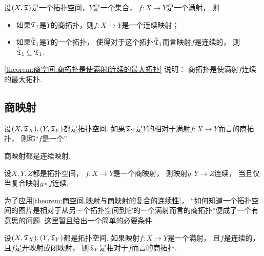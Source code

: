 \begin{theorem}\label{theorem:商空间.商拓扑是使满射f连续的最大拓扑}
设\((X,{\mathfrak T})\)是一个拓扑空间，\(Y\)是一个集合，
\(f\colon X \to Y\)是一个满射，
则\begin{itemize}
	\item 如果\({\mathfrak T}_1\)是\(Y\)的商拓扑，则\(f\colon X \to Y\)是一个连续映射；

	\item 如果\(\widetilde{{\mathfrak T}}_1\)是\(Y\)的一个拓扑，
	使得对于这个拓扑\(\widetilde{{\mathfrak T}}_1\)而言映射\(f\)是连续的，
	则\(\widetilde{{\mathfrak T}}_1 \subseteq {\mathfrak T}_1\).
\end{itemize}
\end{theorem}
\begin{remark}
\cref{theorem:商空间.商拓扑是使满射f连续的最大拓扑} 说明：
商拓扑是使满射\(f\)连续的最大拓扑.
\end{remark}

\subsection{商映射}
\begin{definition}
设\((X,{\mathfrak T}_X),(Y,{\mathfrak T}_Y)\)都是拓扑空间.
如果\({\mathfrak T}_Y\)是\(Y\)的相对于满射\(f\colon X \to Y\)而言的商拓扑，
则称“\(f\)是一个”.
\end{definition}

\begin{property}
商映射都是连续映射.
\end{property}

\begin{theorem}\label{theorem:商空间.映射与商映射的复合的连续性}
设\(X,Y,Z\)都是拓扑空间，
\(f\colon X \to Y\)是一个商映射，
则映射\(g\colon Y \to Z\)连续，
当且仅当复合映射\(g \circ f\)连续.
\end{theorem}

为了应用\cref{theorem:商空间.映射与商映射的复合的连续性}，
“如何知道一个拓扑空间的图片是相对于从另一个拓扑空间到它的一个满射而言的商拓扑”便成了一个有意思的问题.
这里暂且给出一个简单的必要条件.
\begin{theorem}
设\((X,{\mathfrak T}_X),(Y,{\mathfrak T}_Y)\)都是拓扑空间.
如果映射\(f\colon X \to Y\)是一个满射，
且\(f\)是连续的，
且\(f\)是开映射或闭映射，
则\({\mathfrak T}_Y\)是相对于\(f\)而言的商拓扑.
\end{theorem}

